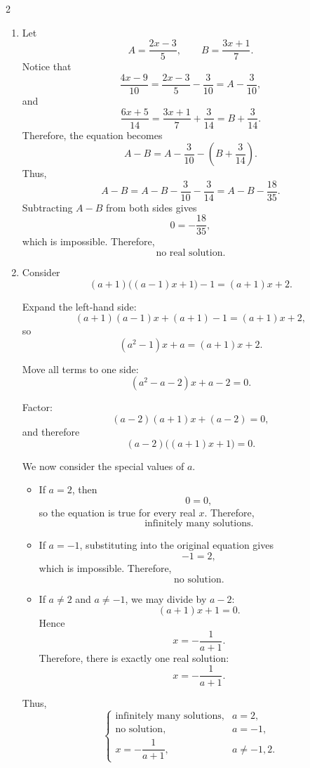 \begin{multicols}{2}
\begin{enumerate}[label=\textbf{\arabic*.}]
			\item Let
			\[
			A=\frac{2x-3}{5},
			\qquad
			B=\frac{3x+1}{7}.
			\]
			Notice that
			\[
			\frac{4x-9}{10}
			=
			\frac{2x-3}{5}-\frac{3}{10}
			=A-\frac{3}{10},
			\]
			and
			\[
			\frac{6x+5}{14}
			=
			\frac{3x+1}{7}+\frac{3}{14}
			=B+\frac{3}{14}.
			\]
			Therefore, the equation becomes
			\[
			A-B
			=
			A-\frac{3}{10}
			-\left(B+\frac{3}{14}\right).
			\]
			Thus,
			\[
			A-B
			=
			A-B-\frac{3}{10}-\frac{3}{14}
			=
			A-B-\frac{18}{35}.
			\]
			Subtracting $A-B$ from both sides gives
			\[
			0=-\frac{18}{35},
			\]
			which is impossible. Therefore,
			\[
			\boxed{\text{no real solution}}.
			\]
			

			\item Consider
			\[
			(a+1)\bigl((a-1)x+1\bigr)-1
			=
			(a+1)x+2.
			\]
			
			Expand the left-hand side:
			\[
			(a+1)(a-1)x+(a+1)-1
			=
			(a+1)x+2,
			\]
			so
			\[
			(a^2-1)x+a
			=
			(a+1)x+2.
			\]
			
			Move all terms to one side:
			\[
			(a^2-a-2)x+a-2=0.
			\]
			
			Factor:
			\[
			(a-2)(a+1)x+(a-2)=0,
			\]
			and therefore
			\[
			(a-2)\bigl((a+1)x+1\bigr)=0.
			\]
			
			We now consider the special values of $a$.
			
			\begin{itemize}
				\item If $a=2$, then
				\[
				0=0,
				\]
				so the equation is true for every real $x$. Therefore,
				\[
				\boxed{\text{infinitely many solutions}}.
				\]
				
				\item If $a=-1$, substituting into the original equation gives
				\[
				-1=2,
				\]
				which is impossible. Therefore,
				\[
				\boxed{\text{no solution}}.
				\]
				
				\item If $a\neq 2$ and $a\neq -1$, we may divide by $a-2$:
				\[
				(a+1)x+1=0.
				\]
				Hence
				\[
				x=-\frac{1}{a+1}.
				\]
				Therefore, there is exactly one real solution:
				\[
				\boxed{x=-\frac{1}{a+1}}.
				\]
			\end{itemize}
			
			Thus,
			\[
			\boxed{
				\begin{cases}
					\text{infinitely many solutions}, & a=2,\\[1mm]
					\text{no solution}, & a=-1,\\[1mm]
					x=-\dfrac{1}{a+1}, & a\neq -1,2.
				\end{cases}
			}
			\]
		

\end{enumerate}
\end{multicols}
